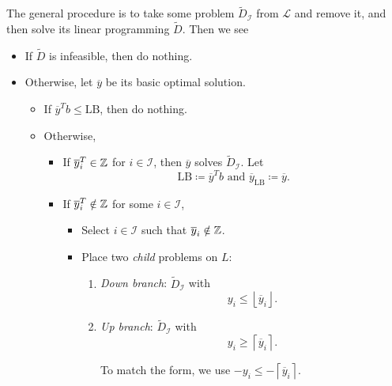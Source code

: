 The general procedure is to take some problem \(\widetilde{D}_{\mathcal{I}}\) from \(\mathcal{L}\) and remove it, and then solve
its linear programming \(\widetilde{D}\). Then we see
\begin{itemize}
	\item If \(\widetilde{D}\) is infeasible, then do nothing.
	\item Otherwise, let \(\overline{y}\) be its basic optimal solution.
	      \begin{itemize}
		      \item If \(\overline{y}^{T}b\leq \mathrm{LB}\), then do nothing.
		      \item Otherwise,
		            \begin{itemize}
			            \item If \(\overline{y}^{T}_i\in\mathbb{\MakeUppercase{Z}}\) for \(i\in \mathcal{I}\), then \(\overline{y}\) solves \(\widetilde{D}_{\mathcal{I}}\).
			                  Let
			                  \[
				                  \mathrm{LB} \coloneqq \overline{y}^{T}b \text{ and } \overline{y}_{\mathrm{LB}}\coloneqq \overline{y}.
			                  \]
			            \item If \(\overline{y}^{T}_{i}\notin \mathbb{\MakeUppercase{Z}}\) for some \(i\in \mathcal{I} \),
			                  \begin{itemize}
				                  \item Select \(i\in \mathcal{I} \) such that \(\overline{y}_{i}\notin \mathbb{\MakeUppercase{Z}}\).
				                  \item Place two \emph{child} problems on \(L\):

				                        \begin{enumerate}
					                        \item \emph{Down branch}: \(\widetilde{D}_{\mathcal{I}}\) with
					                              \[
						                              y_{i}\leq \left\lfloor \overline{y}_{i} \right\rfloor.
					                              \]
					                        \item \emph{Up branch}: \(\widetilde{D}_{\mathcal{I}}\) with
					                              \[
						                              y_{i}\geq \left\lceil \overline{y}_{i} \right\rceil.
					                              \]
					                              \begin{note}
						                              To match the form, we use \(-y_{i}\leq -\left\lceil \overline{y}_{i}\right\rceil\).
					                              \end{note}
				                        \end{enumerate}
			                  \end{itemize}
		            \end{itemize}
	      \end{itemize}
\end{itemize}

